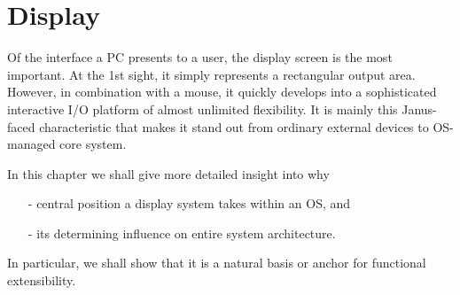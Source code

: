 \chapter{Display}
\label{ch:display}
Of the interface a PC presents to a user, the display screen is the most important.
At the 1st sight, it simply represents a rectangular output area.
However, in combination with a mouse, it quickly develops into a sophisticated interactive
I/O platform of almost unlimited flexibility.
It is mainly this Janus-faced characteristic that makes it stand out
from ordinary external devices to OS-managed core system.

In this chapter we shall give more detailed insight into why
\begin{itemize}
  \item[-] central position a display system takes within an OS, and
  \item[-] its determining influence on entire system architecture.
\end{itemize}
In particular, we shall show that it is a natural basis or anchor for functional extensibility.
